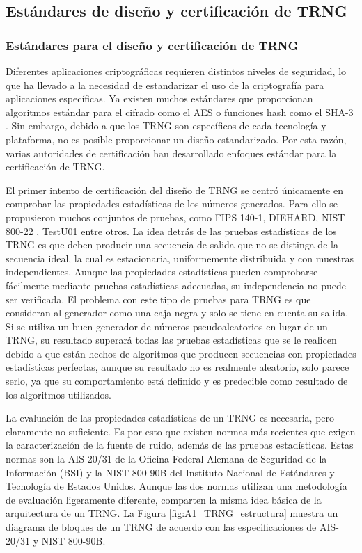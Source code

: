 	
        \subsection{Estándares de diseño y certificación de TRNG}
	
		    \subsubsection{Estándares para el diseño y certificación de TRNG}
	
                Diferentes aplicaciones criptográficas requieren distintos niveles de seguridad, lo que ha llevado a la necesidad de estandarizar el uso de la criptografía para aplicaciones específicas. Ya existen muchos estándares que proporcionan algoritmos estándar para el cifrado como el AES \cite{Dworkin2001}  o funciones hash como el SHA-3 \cite{Dang2015}. Sin embargo, debido a que los TRNG son específicos de cada tecnología y plataforma, no es posible proporcionar un diseño estandarizado. Por esta razón, varias autoridades de certificación han desarrollado enfoques estándar para la certificación de TRNG.

                El primer intento de certificación del diseño de TRNG se centró únicamente en comprobar las propiedades estadísticas de los números generados. Para ello se propusieron muchos conjuntos de pruebas, como FIPS 140-1, DIEHARD, NIST 800-22 \cite{Nist2010}, TestU01 entre otros. La idea detrás de las pruebas estadísticas de los TRNG es que deben producir una secuencia de salida que no se distinga de la secuencia ideal, la cual es estacionaria, uniformemente distribuida y con muestras independientes. Aunque las propiedades estadísticas pueden comprobarse fácilmente mediante pruebas estadísticas adecuadas, su independencia no puede ser verificada. El problema con este tipo de pruebas para TRNG es que consideran al generador como una caja negra y solo se tiene en cuenta su salida. Si se utiliza un buen generador de números pseudoaleatorios en lugar de un TRNG, su resultado superará todas las pruebas estadísticas que se le realicen debido a que están hechos de algoritmos que producen secuencias con propiedades estadísticas perfectas, aunque su resultado no es realmente aleatorio, solo parece serlo, ya que su comportamiento está definido y es predecible como resultado de los algoritmos utilizados.

                La evaluación de las propiedades estadísticas de un TRNG es necesaria, pero claramente no suficiente. Es por esto que existen normas más recientes que exigen la caracterización de la fuente de ruido, además de las pruebas estadísticas. Estas normas son la AIS-20/31 \cite{AIS2011} de la Oficina Federal Alemana de Seguridad de la Información (BSI) y la NIST 800-90B \cite{Turan2018} del Instituto Nacional de Estándares y Tecnología de Estados Unidos. Aunque las dos normas utilizan una metodología de evaluación ligeramente diferente, comparten la misma idea básica de la arquitectura de un TRNG. La Figura \ref{fig:A1_TRNG_estructura} muestra un diagrama de bloques de un TRNG de acuerdo con las especificaciones de AIS-20/31 y NIST 800-90B.


